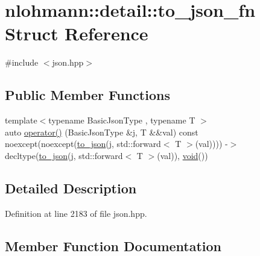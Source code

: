 \hypertarget{structnlohmann_1_1detail_1_1to__json__fn}{}\section{nlohmann\+::detail\+::to\+\_\+json\+\_\+fn Struct Reference}
\label{structnlohmann_1_1detail_1_1to__json__fn}


{\ttfamily \#include $<$json.\+hpp$>$}

\subsection*{Public Member Functions}
\begin{DoxyCompactItemize}
\item 
{\footnotesize template$<$typename Basic\+Json\+Type , typename T $>$ }\\auto \mbox{\hyperlink{structnlohmann_1_1detail_1_1to__json__fn_aecfb5114c8a737fc89d98589482795b8}{operator()}} (Basic\+Json\+Type \&j, T \&\&val) const noexcept(noexcept(\mbox{\hyperlink{namespacenlohmann_1_1detail_a1a804b98cbe89b7e44b698f2ca860490}{to\+\_\+json}}(j, std\+::forward$<$ T $>$(val)))) -\/$>$ decltype(\mbox{\hyperlink{namespacenlohmann_1_1detail_a1a804b98cbe89b7e44b698f2ca860490}{to\+\_\+json}}(j, std\+::forward$<$ T $>$(val)), \mbox{\hyperlink{namespacenlohmann_1_1detail_a59fca69799f6b9e366710cb9043aa77d}{void}}())
\end{DoxyCompactItemize}


\subsection{Detailed Description}


Definition at line 2183 of file json.\+hpp.



\subsection{Member Function Documentation}
\mbox{\label{structnlohmann_1_1detail_1_1to__json__fn_aecfb5114c8a737fc89d98589482795b8}} 
